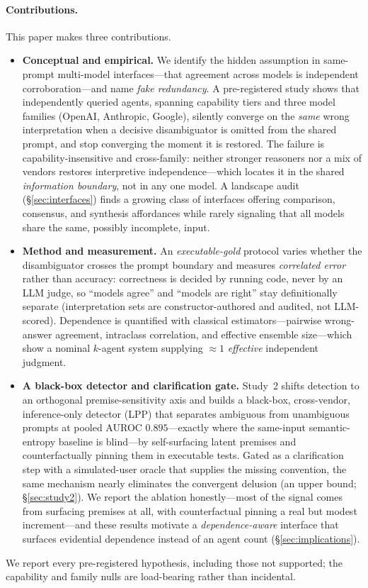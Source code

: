 \documentclass[acmsmall,screen,nonacm]{acmart}
\begin{document}
\paragraph{Contributions.} This paper makes three contributions.
\begin{itemize}
\item \textbf{Conceptual and empirical.} We identify the hidden assumption in same-prompt multi-model
interfaces---that agreement across models is independent corroboration---and name \emph{fake redundancy}. A
pre-registered study shows that independently queried agents, spanning capability tiers and three model
families (OpenAI, Anthropic, Google), silently converge on the \emph{same} wrong interpretation when a
decisive disambiguator is omitted from the shared prompt, and stop converging the moment it is restored.
The failure is capability-insensitive and cross-family: neither stronger reasoners nor a mix of vendors
restores interpretive independence---which locates it in the shared \emph{information boundary}, not in any
one model. A landscape audit (\S\ref{sec:interfaces}) finds a growing class of interfaces offering
comparison, consensus, and synthesis affordances while rarely signaling that all models share the same,
possibly incomplete, input.
\item \textbf{Method and measurement.} An \emph{executable-gold} protocol varies whether the disambiguator
crosses the prompt boundary and measures \emph{correlated error} rather than accuracy: correctness is
decided by running code, never by an LLM judge, so ``models agree'' and ``models are right'' stay
definitionally separate (interpretation sets are constructor-authored and audited, not LLM-scored).
Dependence is quantified with classical estimators---pairwise wrong-answer agreement, intraclass
correlation, and effective ensemble size---which show a nominal $k$-agent system supplying $\approx\!1$
\emph{effective} independent judgment.
\item \textbf{A black-box detector and clarification gate.} Study~2 shifts detection to an orthogonal
premise-sensitivity axis and builds a black-box, cross-vendor, inference-only detector (LPP) that separates
ambiguous from unambiguous prompts at pooled AUROC $0.895$---exactly where the same-input semantic-entropy
baseline is blind---by self-surfacing latent premises and counterfactually pinning them in executable tests.
Gated as a clarification step with a simulated-user oracle that supplies the missing convention, the same
mechanism nearly eliminates the convergent delusion (an upper bound; \S\ref{sec:study2}). We report the
ablation honestly---most of the signal comes from surfacing premises at all, with counterfactual pinning a
real but modest increment---and these results motivate a \emph{dependence-aware} interface that surfaces
evidential dependence instead of an agent count (\S\ref{sec:implications}).
\end{itemize}
We report every pre-registered hypothesis, including those not supported; the capability and family nulls
are load-bearing rather than incidental.
\end{document}
